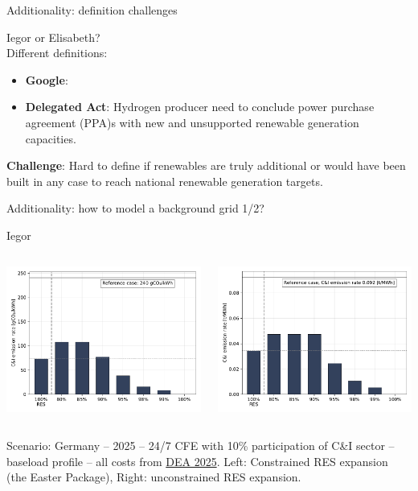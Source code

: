 \begin{frame}{Additionality: definition challenges}

  Iegor or Elisabeth?\\
Different definitions:
\begin{itemize}
	\item \textbf{Google}:
	\item \textbf{Delegated Act}: Hydrogen producer need to conclude power purchase agreement (PPA)s with new and unsupported renewable generation capacities. 
\end{itemize}
\textbf{Challenge}: Hard to define if renewables are truly additional or would have been built in any case to reach national renewable generation targets.
\end{frame}


\begin{frame}{Additionality: how to model a background grid 1/2?}

  Iegor

  \begin{columns}
    \begin{column}{7cm}
      \includegraphics[width=7.5cm]{images/10-2025-DE-p3-ci_emisrate.pdf}
    \end{column}
    \begin{column}{7cm}
      \includegraphics[width=7.5cm]{images/ci_emisrate.pdf}
    \end{column}
  \end{columns}

  Scenario: Germany -- 2025 -- 24/7 CFE with 10\% participation of C\&I sector -- baseload profile -- all costs from \href{https://ens.dk/en/our-services/technology-catalogues}{DEA 2025}. Left: Constrained RES expansion (the Easter Package), Right: unconstrained RES expansion.
\end{frame}


